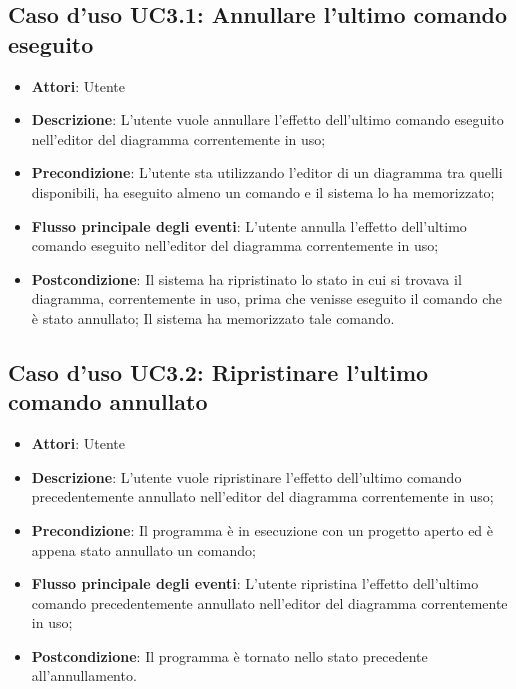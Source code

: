 \documentclass[../AnalisiDeiRequisiti.tex]{subfiles}
\begin{document}
					\subsection{Caso d'uso UC3.1: Annullare l'ultimo comando eseguito}
					\begin{itemize}
						\item \textbf{Attori}: Utente
						\item \textbf{Descrizione}: L'utente vuole annullare l'effetto dell'ultimo comando eseguito nell'editor del diagramma correntemente in uso;
						\item \textbf{Precondizione}: L'utente sta utilizzando l'editor di un diagramma tra quelli disponibili, ha eseguito almeno un comando e il sistema lo ha memorizzato;
						\item \textbf{Flusso principale degli eventi}: L'utente annulla l'effetto dell'ultimo comando eseguito nell'editor del diagramma correntemente in uso;
						\item \textbf{Postcondizione}: Il sistema ha ripristinato lo stato in cui si trovava il diagramma, correntemente in uso, prima che venisse eseguito il comando che è stato annullato; Il sistema ha memorizzato tale comando.
					\end{itemize}
					\subsection{Caso d'uso UC3.2: Ripristinare l'ultimo comando annullato}
					\begin{itemize}
						\item \textbf{Attori}: Utente
						\item \textbf{Descrizione}: L'utente vuole ripristinare l'effetto dell'ultimo comando precedentemente annullato nell'editor del diagramma correntemente in uso;
						\item \textbf{Precondizione}: Il programma è in esecuzione con un progetto aperto ed è appena stato annullato un comando;
						\item \textbf{Flusso principale degli eventi}: L'utente ripristina l'effetto dell'ultimo comando precedentemente annullato nell'editor del diagramma correntemente in uso;
						\item \textbf{Postcondizione}: Il programma è tornato nello stato precedente all'annullamento.
					\end{itemize}
\end{document}
